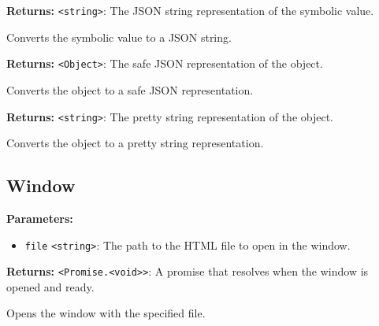 \documentclass[12pt,a4paper]{article}
\begin{document}
\vspace{5mm}
\noindent {}


\noindent \textbf{Returns:} \texttt{<string>}: The JSON string representation of the symbolic value.

\noindent Converts the symbolic value to a JSON string.

\vspace{5mm}
\noindent {}


\noindent \textbf{Returns:} \texttt{<Object>}: The safe JSON representation of the object.

\noindent Converts the object to a safe JSON representation.

\vspace{5mm}
\noindent {}


\noindent \textbf{Returns:} \texttt{<string>}: The pretty string representation of the object.

\noindent Converts the object to a pretty string representation.


\subsection{Window}
\vspace{5mm}
\noindent {}


\noindent \textbf{Parameters:}
\begin{itemize}
  \item \texttt{file} \texttt{<string>}: The path to the HTML file to open in the window.
\end{itemize}

\noindent \textbf{Returns:} \texttt{<Promise.<void>>}: A promise that resolves when the window is opened and ready.

\noindent Opens the window with the specified file.

\vspace{5mm}
\noindent {}
\end{document}
